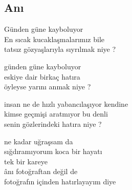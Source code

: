 \subsection{Anı}

Günden güne kayboluyor \\
En sıcak kucaklaşmalarımız bile \\
tatsız gözyaşlarıyla sıyrılmak niye ?

\noindent\newline
günden güne kayboluyor \\
eskiye dair birkaç hatıra \\
öyleyse yarını anmak niye ?

\noindent\newline
insan ne de hızlı yabancılaşıyor kendine \\
kimse geçmişi aratmıyor bu denli \\
senin gözlerindeki hatıra niye ?

\noindent\newline
ne kadar uğraşsam da \\
sığdıramıyorum koca bir hayatı \\
tek bir kareye \\
ânı fotoğraftan değil de \\
fotoğrafın içinden hatırlayayım diye